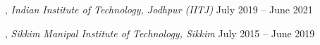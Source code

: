 
, \textit{Indian Institute of Technology, Jodhpur (IITJ)}	\hfill July 2019 -- June 2021

, \textit{Sikkim Manipal Institute of Technology, Sikkim}	\hfill July 2015 -- June 2019


